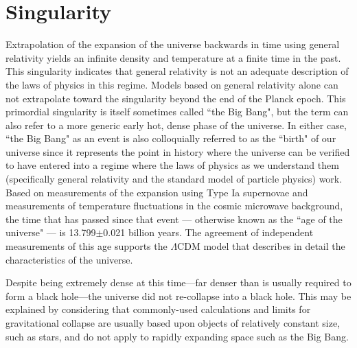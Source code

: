 \documentclass[14pt, oneside]{book}
\begin{document}
		\section{Singularity}
			Extrapolation of the expansion of the universe backwards in time using general relativity yields an infinite density and temperature at a finite time in the past. This singularity indicates that general relativity is not an adequate description of the laws of physics in this regime. Models based on general relativity alone can not extrapolate toward the singularity beyond the end of the Planck epoch.
			This primordial singularity is itself sometimes called ``the Big Bang", but the term can also refer to a more generic early hot, dense phase of the universe. In either case, ``the Big Bang" as an event is also colloquially referred to as the ``birth" of our universe since it represents the point in history where the universe can be verified to have entered into a regime where the laws of physics as we understand them (specifically general relativity and the standard model of particle physics) work. Based on measurements of the expansion using Type Ia supernovae and measurements of temperature fluctuations in the cosmic microwave background, the time that has passed since that event --- otherwise known as the ``age of the universe" --- is 13.799$\pm$0.021 billion years. The agreement of independent measurements of this age supports the $\Lambda$CDM model that describes in detail the characteristics of the universe.
			
			Despite being extremely dense at this time---far denser than is usually required to form a black hole---the universe did not re-collapse into a black hole. This may be explained by considering that commonly-used calculations and limits for gravitational collapse are usually based upon objects of relatively constant size, such as stars, and do not apply to rapidly expanding space such as the Big Bang.
		
\end{document}

